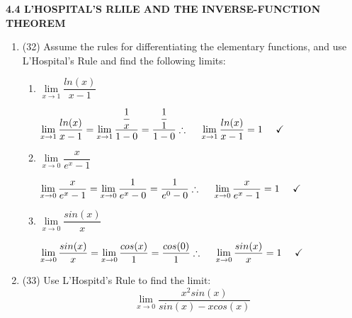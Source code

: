 \documentclass[fleqn]{article}
\begin{document}
  \textbf{4.4 L'HOSPITAL'S RLILE AND THE INVERSE-FUNCTION THEOREM}
  \begin{enumerate}
    \item (32) Assume the rules for differentiating the elementary functions, and use L'Hospital's Rule
    and find the following limits: 
    \begin{enumerate}
      \item $\lim\limits_{x \to 1} \dfrac{ln(x)}{x-1}$

        \textcolor{hwColor}{
          $
            \lim\limits_{x \to 1} \dfrac{ln(x)}{x-1}
            =\lim\limits_{x \to 1} \dfrac{\dfrac{1}{x}}{1-0}
            =\dfrac{\dfrac{1}{1}}{1-0}
            \\
            \\
            \\
            \therefore ~~~~ \lim\limits_{x \to 1} \dfrac{ln(x)}{x-1}=1 ~~~~ \checkmark
            \\
          $
        }

      \item $\lim\limits_{x \to 0} \dfrac{x}{e^x-1}$

        \textcolor{hwColor}{
          $
            \lim\limits_{x \to 0} \dfrac{x}{e^x-1}
            =\lim\limits_{x \to 0} \dfrac{1}{e^x-0}
            =\dfrac{1}{e^0-0}
            \\
            \\
            \\
            \therefore ~~~~ \lim\limits_{x \to 0} \dfrac{x}{e^x-1}=1 ~~~~ \checkmark
            \\
          $
        }

      \item $\lim\limits_{x \to 0} \dfrac{sin(x)}{x}$

        \textcolor{hwColor}{
          $
            \lim\limits_{x \to 0} \dfrac{sin(x)}{x}
            =\lim\limits_{x \to 0} \dfrac{cos(x)}{1}
            =\dfrac{cos(0)}{1}
            \\
            \\
            \\
            \therefore ~~~~ \lim\limits_{x \to 0} \dfrac{sin(x)}{x}=1 ~~~~ \checkmark
            \\
          $
        }

    \end{enumerate}

    \pagebreak

    \item (33) Use L'Hospitd's Rule to find the limit:
    $$
      \lim\limits_{x \to 0} \dfrac{x^2 sin(x)}{sin(x)-x cos(x)}
    $$


\end{enumerate}
\end{document}
